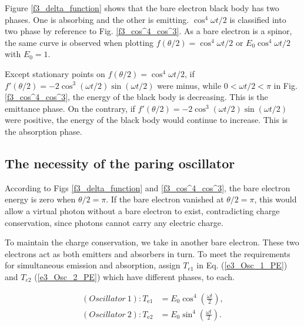 \documentclass[%
 reprint,
 amsmath,amssymb,
 aps,
]{revtex4-1}
\numberwithin{equation}{section}%
\begin{document}
    Figure \ref{f3_delta_function} shows that the bare electron black body has two phases. One is absorbing and the other is emitting. $\cos^{4} \omega t /2$ is classified into two phase by reference to Fig. \ref{f3_cos^4_cos^3}. As a bare electron is a spinor, the same curve is observed when plotting  $f(\theta /2)=\cos^{4} \omega t /2$ or $E_{0} \cos^{4}  \omega t /2$ with $E_{0} = 1$.

    Except stationary points on $f(\theta /2)=\cos^{4} \omega t /2$, if $f'(\theta /2) = -2 \cos^{3} (\omega t /2) \sin ( \omega t /2)$ were minus, while $ 0 < \omega t /2 < \pi $ in Fig. \ref{f3_cos^4_cos^3}, the energy of the black body is decreasing. This is the emittance phase. On the contrary, if $f'(\theta/2) = -2 \cos^{3} (\omega t /2) \sin (\omega t /2)$ were positive, the energy of the black body would continue to increase. This is the absorption phase.



\subsection{The necessity of the paring oscillator}
\label{The_necessity_of_the_paring_oscillator}


    According to Figs \ref{f3_delta_function} and \ref{f3_cos^4_cos^3}, the bare electron energy is zero when $ \theta /2 = \pi $. If the bare electron vanished at $ \theta /2 = \pi $, this would allow a virtual photon without a bare electron to exist, contradicting charge conservation, since photons cannot carry any electric charge.
        
    To maintain the charge conservation, we take in another bare electron. These two electrons act as both emitters and absorbers in turn. To meet the requirements for simultaneous emission and absorption, assign $T_{e1}$ in Eq. (\ref{e3_Osc_1_PE}) and $T_{e2}$ (\ref{e3_Osc_2_PE}) which have different phases, to each.

        \begin{equation}
            \begin{split}
                (Oscillator \ 1): T_{\mathrm{e1}}
                    &= E_{0} \cos^{4} \left( \frac{\omega t}{2} \right) , \\
                (Oscillator \ 2): T_{\mathrm{e2}}
                    &= E_{0} \sin^{4} \left( \frac{\omega t}{2} \right)
                    .
            \label{e3_Oscillators_Te1_Te2}
            \end{split}
        \end{equation}
\end{document}

